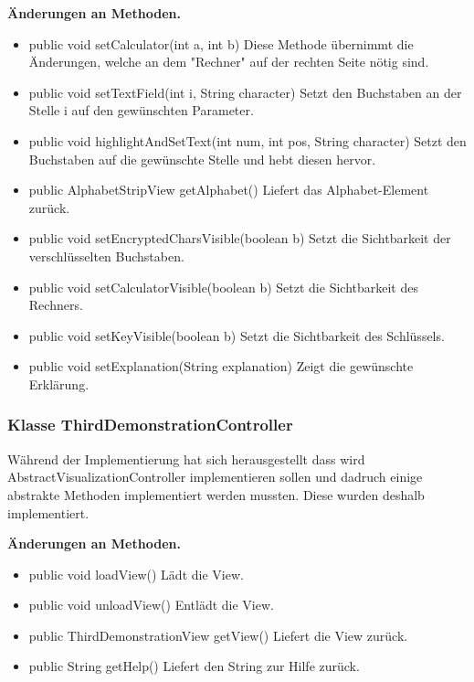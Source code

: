 \documentclass{article}
\begin{document}
    \textbf{Änderungen an Methoden.}
      \begin{itemize}
        \item public void setCalculator(int a, int b)\newline
              Diese Methode übernimmt die Änderungen, welche an dem "Rechner" auf der rechten Seite nötig sind.
        \item public void setTextField(int i, String character)\newline
              Setzt den Buchstaben an der Stelle i auf den gewünschten Parameter.
		\item public void highlightAndSetText(int num, int pos, String character)\newline
              Setzt den Buchstaben auf die gewünschte Stelle und hebt diesen hervor.
		\item public AlphabetStripView getAlphabet()\newline
              Liefert das Alphabet-Element zurück.
		\item public void setEncryptedCharsVisible(boolean b)\newline
              Setzt die Sichtbarkeit der verschlüsselten Buchstaben.
		\item public void setCalculatorVisible(boolean b)\newline
              Setzt die Sichtbarkeit des Rechners.
		\item public void setKeyVisible(boolean b)\newline
              Setzt die Sichtbarkeit des Schlüssels.
		\item public void setExplanation(String explanation)\newline
              Zeigt die gewünschte Erklärung.
	  \end{itemize}

    \subsubsection{Klasse ThirdDemonstrationController}
	Während der Implementierung hat sich herausgestellt dass wird AbstractVisualizationController implementieren sollen und dadruch 
	einige abstrakte Methoden implementiert werden mussten. Diese wurden deshalb implementiert.\newline
           
    \textbf{Änderungen an Methoden.}
      \begin{itemize}
		\item public void loadView()\newline
              Lädt die View.
        \item public void unloadView()\newline
              Entlädt die View.
        \item public ThirdDemonstrationView getView()\newline
              Liefert die View zurück.
        \item public String getHelp()\newline
              Liefert den String zur Hilfe zurück.
      \end{itemize}
\end{document}
